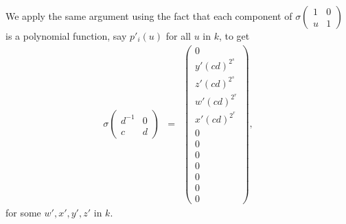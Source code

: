 We apply the same argument using the fact that each component of $\sigma\left(\begin{matrix} 1 & 0 \\ u & 1\end{matrix}\right)$ is a polynomial function, say $p'_i(u)$ for all $u$ in $k$, to get
\begin{eqnarray*}
\sigma\left(\begin{matrix} d^{-1} & 0 \\ c & d \end{matrix}\right) &=&
\left( \begin{matrix}
0 \\
y'(cd)^{2^s} \\
z'(cd)^{2^s} \\
w'(cd)^{2^r} \\
x'(cd)^{2^r} \\
0 \\
0 \\
0 \\
0 \\
0 \\
0 \\
0
\end{matrix} \right),
\end{eqnarray*}
for some $w', x', y', z'$ in $k$.

